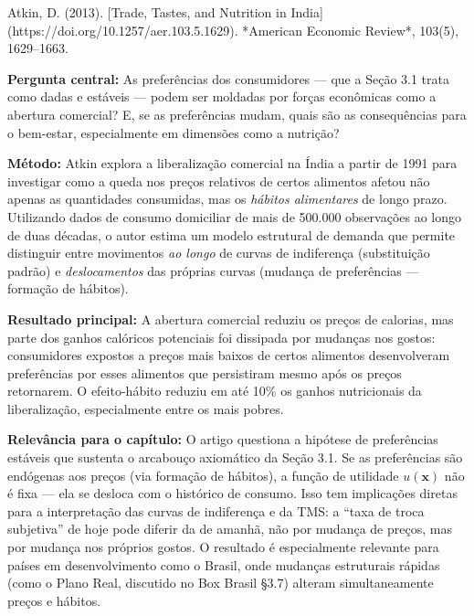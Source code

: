 \documentclass[11pt,twoside,openright]{book}
\begin{document}
\begin{pesquisabox}{Atkin, D. (2013). [Trade, Tastes, and Nutrition in India](https://doi.org/10.1257/aer.103.5.1629). *American Economic Review*, 103(5), 1629–1663.}

\textbf{Pergunta central:} As preferências dos consumidores --- que a
Seção 3.1 trata como dadas e estáveis --- podem ser moldadas por forças
econômicas como a abertura comercial? E, se as preferências mudam, quais
são as consequências para o bem-estar, especialmente em dimensões como a
nutrição?

\textbf{Método:} Atkin explora a liberalização comercial na Índia a
partir de 1991 para investigar como a queda nos preços relativos de
certos alimentos afetou não apenas as quantidades consumidas, mas os
\emph{hábitos alimentares} de longo prazo. Utilizando dados de consumo
domiciliar de mais de 500.000 observações ao longo de duas décadas, o
autor estima um modelo estrutural de demanda que permite distinguir
entre movimentos \emph{ao longo} de curvas de indiferença (substituição
padrão) e \emph{deslocamentos} das próprias curvas (mudança de
preferências --- formação de hábitos).

\textbf{Resultado principal:} A abertura comercial reduziu os preços de
calorias, mas parte dos ganhos calóricos potenciais foi dissipada por
mudanças nos gostos: consumidores expostos a preços mais baixos de
certos alimentos desenvolveram preferências por esses alimentos que
persistiram mesmo após os preços retornarem. O efeito-hábito reduziu em
até 10\% os ganhos nutricionais da liberalização, especialmente entre os
mais pobres.

\textbf{Relevância para o capítulo:} O artigo questiona a hipótese de
preferências estáveis que sustenta o arcabouço axiomático da Seção 3.1.
Se as preferências são endógenas aos preços (via formação de hábitos), a
função de utilidade \(u(\mathbf{x})\) não é fixa --- ela se desloca com
o histórico de consumo. Isso tem implicações diretas para a
interpretação das curvas de indiferença e da TMS: a ``taxa de troca
subjetiva'' de hoje pode diferir da de amanhã, não por mudança de
preços, mas por mudança nos próprios gostos. O resultado é especialmente
relevante para países em desenvolvimento como o Brasil, onde mudanças
estruturais rápidas (como o Plano Real, discutido no Box Brasil §3.7)
alteram simultaneamente preços e hábitos.

\end{pesquisabox}
\end{document}
